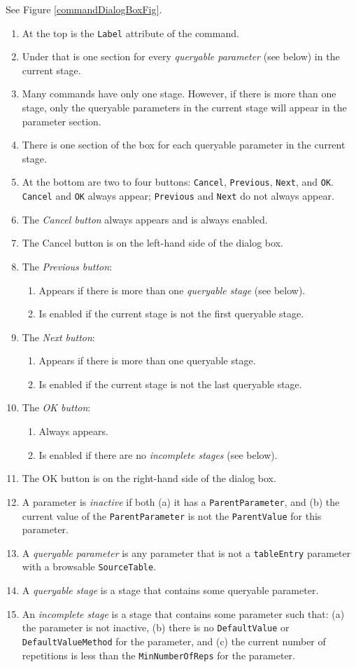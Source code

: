 \documentclass[11pt]{article}
\begin{document}
See Figure \ref{commandDialogBoxFig}.
\begin{enumerate}
\item At the top is the {\tt Label} attribute of the command.
\item Under that is one section for every {\it queryable parameter}
  (see below) in the current stage.
\item Many commands have only one stage.  However, if there is
  more than one stage, only the queryable parameters in the current stage
  will appear in the parameter section.
\item There is one section of the box for each queryable parameter in the
  current stage.
\item At the bottom are two to four buttons: {\tt Cancel}, {\tt Previous},
  {\tt Next}, and {\tt OK}.  {\tt Cancel} and {\tt OK} always appear;
  {\tt Previous} and {\tt Next} do not always appear.
\item The {\it Cancel button} always appears and is always enabled.
\item The Cancel button is on the left-hand side of the dialog box.
\item The {\it Previous button}:
  \begin{enumerate}
  \item Appears if there is more than one {\it queryable stage} (see below).
  \item Is enabled if the current stage is not the first queryable stage.
  \end{enumerate}
\item The {\it Next button}:
  \begin{enumerate}
  \item Appears if there is more than one queryable stage.
  \item Is enabled if the current stage is not the last queryable stage.
  \end{enumerate}
\item The {\it OK button}:
  \begin{enumerate}
  \item Always appears.
  \item Is enabled if there are no {\it incomplete stages} (see below).
  \end{enumerate}
\item The OK button is on the right-hand side of the dialog box.
\item A parameter is {\it inactive} if both (a) it has a {\tt ParentParameter},
  and (b) the current value of the {\tt ParentParameter} is not the
  {\tt ParentValue} for this parameter.
\item A {\it queryable parameter} is any parameter
  that is not a {\tt tableEntry} parameter with
  a browsable {\tt SourceTable}.
\item A {\it queryable stage} is a stage that contains some
  queryable parameter.
\item An {\it incomplete stage} is a stage that contains some parameter
  such that: (a) the parameter is not inactive, (b) there is no
  {\tt DefaultValue} or {\tt DefaultValueMethod} for the parameter,
  and (c) the current number of repetitions is less than the
  {\tt MinNumberOfReps} for the parameter.
\end{enumerate}
\end{document}
